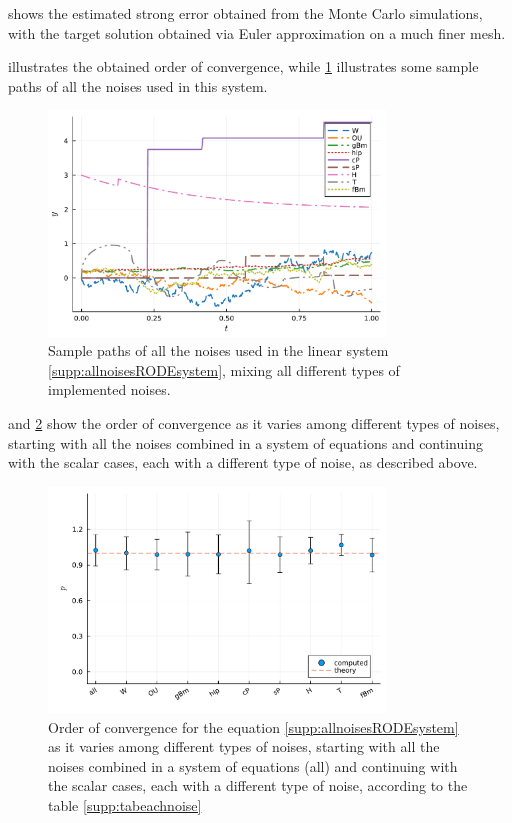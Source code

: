 \documentclass[reqno,12pt]{amsart}
\theoremstyle{plain} %
\theoremstyle{definition} %
\begin{document}
 shows the estimated strong error obtained from the Monte Carlo simulations, with the target solution obtained via Euler approximation on a much finer mesh.

 illustrates the obtained order of convergence, while \cref{supp:figsamplepathsallnoises} illustrates some sample paths of all the noises used in this system.

\begin{figure}[htb]
    \centerline{\includegraphics[width=0.8\textwidth]{img/noisepath_allnoises.pdf}}
    \caption{Sample paths of all the noises used in the linear system \cref{supp:allnoisesRODEsystem}, mixing all different types of implemented noises.}
    \label{supp:figsamplepathsallnoises}
\end{figure}

 and \cref{supp:figordereachnoise} show the order of convergence as it varies among different types of noises, starting with all the noises combined in a system of equations and continuing with the scalar cases, each with a different type of noise, as described above.

\begin{figure}[htb]
    \centerline{\includegraphics[width=0.8\textwidth]{img/order_dep_on_noise_allnoises.pdf}}
    \caption{Order of convergence for the equation \cref{supp:allnoisesRODEsystem} as it varies among different types of noises, starting with all the noises combined in a system of equations (all) and continuing with the scalar cases, each with a different type of noise, according to the table \cref{supp:tabeachnoise}}
    \label{supp:figordereachnoise}
\end{figure}
\end{document}
